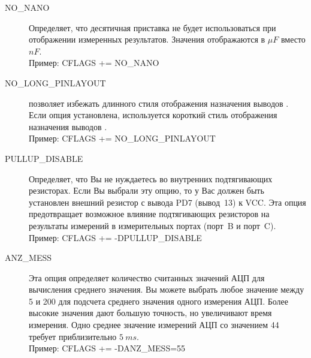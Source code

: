 \begin{description}
  \item[NO\_NANO] Определяет, что десятичная приставка  не будет использоваться при отображении измеренных 
результатов. Значения отображаются в \(\mu F\) вместо \(nF\).\\
Пример: CFLAGS += NO\_NANO

  \item[NO\_LONG\_PINLAYOUT] позволяет избежать длинного стиля отображения назначения выводов .
  Если опция установлена, используется короткий стиль отображения назначения выводов .\\
Пример: CFLAGS += NO\_LONG\_PINLAYOUT

  \item[PULLUP\_DISABLE] Определяет, что Вы не нуждаетесь во внутренних подтягивающих резисторах. Если Вы выбрали 
эту опцию, то у Вас должен быть установлен внешний резистор с вывода PD7 (вывод~13) к VCC. Эта опция предотвращает 
возможное влияние подтягивающих резисторов на результаты измерений в измерительных портах (порт~B и порт~C).\\
Пример: CFLAGS += -DPULLUP\_DISABLE

  \item[ANZ\_MESS] Эта опция определяет количество считанных значений АЦП для вычисления среднего значения. 
Вы можете выбрать любое значение между 5 и 200 для подсчета среднего значения одного измерения АЦП. Более 
высокие значения дают большую точность, но увеличивают время измерения. Одно среднее значение измерений АЦП 
со значением 44 требует приблизительно \(5~ms\).\\
Пример: CFLAGS += -DANZ\_MESS=55


\end{description}
